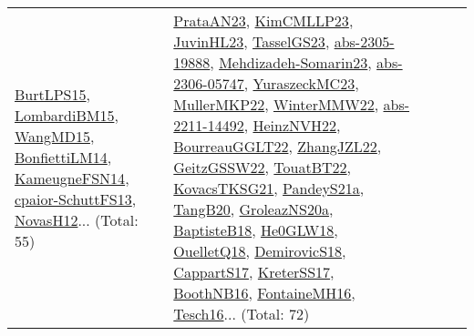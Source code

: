 {\begin{longtable}{lp{3cm}>{\raggedright}p{6cm}>{\raggedright}p{6cm}p{8cm}}
\href{papers/BurtLPS15.pdf}{BurtLPS15}\cite{BurtLPS15}, \href{papers/LombardiBM15.pdf}{LombardiBM15}\cite{LombardiBM15}, \href{articles/WangMD15.pdf}{WangMD15}\cite{WangMD15}, \href{papers/BonfiettiLM14.pdf}{BonfiettiLM14}\cite{BonfiettiLM14}, \href{articles/KameugneFSN14.pdf}{KameugneFSN14}\cite{KameugneFSN14}, \href{papers/cpaior-SchuttFS13.pdf}{cpaior-SchuttFS13}\cite{cpaior-SchuttFS13}, \href{articles/NovasH12.pdf}{NovasH12}\cite{NovasH12}... (Total: 55) & \href{articles/PrataAN23.pdf}{PrataAN23}\cite{PrataAN23}, \href{papers/KimCMLLP23.pdf}{KimCMLLP23}\cite{KimCMLLP23}, \href{papers/JuvinHL23.pdf}{JuvinHL23}\cite{JuvinHL23}, \href{papers/TasselGS23.pdf}{TasselGS23}\cite{TasselGS23}, \href{articles/abs-2305-19888.pdf}{abs-2305-19888}\cite{abs-2305-19888}, \href{papers/Mehdizadeh-Somarin23.pdf}{Mehdizadeh-Somarin23}\cite{Mehdizadeh-Somarin23}, \href{articles/abs-2306-05747.pdf}{abs-2306-05747}\cite{abs-2306-05747}, \href{papers/YuraszeckMC23.pdf}{YuraszeckMC23}\cite{YuraszeckMC23}, \href{articles/MullerMKP22.pdf}{MullerMKP22}\cite{MullerMKP22}, \href{papers/WinterMMW22.pdf}{WinterMMW22}\cite{WinterMMW22}, \href{articles/abs-2211-14492.pdf}{abs-2211-14492}\cite{abs-2211-14492}, \href{articles/HeinzNVH22.pdf}{HeinzNVH22}\cite{HeinzNVH22}, \href{articles/BourreauGGLT22.pdf}{BourreauGGLT22}\cite{BourreauGGLT22}, \href{papers/ZhangJZL22.pdf}{ZhangJZL22}\cite{ZhangJZL22}, \href{papers/GeitzGSSW22.pdf}{GeitzGSSW22}\cite{GeitzGSSW22}, \href{papers/TouatBT22.pdf}{TouatBT22}\cite{TouatBT22}, \href{papers/KovacsTKSG21.pdf}{KovacsTKSG21}\cite{KovacsTKSG21}, \href{articles/PandeyS21a.pdf}{PandeyS21a}\cite{PandeyS21a}, \href{papers/TangB20.pdf}{TangB20}\cite{TangB20}, \href{papers/GroleazNS20a.pdf}{GroleazNS20a}\cite{GroleazNS20a}, \href{articles/BaptisteB18.pdf}{BaptisteB18}\cite{BaptisteB18}, \href{papers/He0GLW18.pdf}{He0GLW18}\cite{He0GLW18}, \href{papers/OuelletQ18.pdf}{OuelletQ18}\cite{OuelletQ18}, \href{papers/DemirovicS18.pdf}{DemirovicS18}\cite{DemirovicS18}, \href{papers/CappartS17.pdf}{CappartS17}\cite{CappartS17}, \href{articles/KreterSS17.pdf}{KreterSS17}\cite{KreterSS17}, \href{papers/BoothNB16.pdf}{BoothNB16}\cite{BoothNB16}, \href{papers/FontaineMH16.pdf}{FontaineMH16}\cite{FontaineMH16}, \href{papers/Tesch16.pdf}{Tesch16}\cite{Tesch16}... (Total: 72)\\

\end{longtable}}
